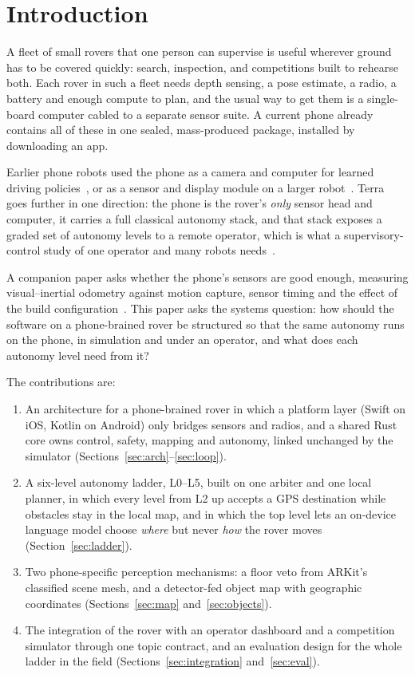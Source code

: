 \documentclass[conference]{IEEEtran}
\begin{document}
\section{Introduction}
\label{sec:intro}

A fleet of small rovers that one person can supervise is useful wherever ground has to be covered quickly: search, inspection, and competitions built to rehearse both.
Each rover in such a fleet needs depth sensing, a pose estimate, a radio, a battery and enough compute to plan, and the usual way to get them is a single-board computer cabled to a separate sensor suite.
A current phone already contains all of these in one sealed, mass-produced package, installed by downloading an app.

Earlier phone robots used the phone as a camera and computer for learned driving policies~\cite{muller2021openbot}, or as a sensor and display module on a larger robot~\cite{oros2013smartphone,fong2013smartspheres}.
Terra goes further in one direction: the phone is the rover's \emph{only} sensor head and computer, it carries a full classical autonomy stack, and that stack exposes a graded set of autonomy levels to a remote operator, which is what a supervisory-control study of one operator and many robots needs~\cite{parasuraman2000levels,beer2014lora,goodrich2001adjustable,cummings2008capacity}.

A companion paper asks whether the phone's sensors are good enough, measuring visual--inertial odometry against motion capture, sensor timing and the effect of the build configuration~\cite{companion2026phone}.
This paper asks the systems question: how should the software on a phone-brained rover be structured so that the same autonomy runs on the phone, in simulation and under an operator, and what does each autonomy level need from it?

The contributions are:
\begin{enumerate}
\item An architecture for a phone-brained rover in which a platform layer (Swift on iOS, Kotlin on Android) only bridges sensors and radios, and a shared Rust core owns control, safety, mapping and autonomy, linked unchanged by the simulator (Sections~\ref{sec:arch}--\ref{sec:loop}).
\item A six-level autonomy ladder, L0--L5, built on one arbiter and one local planner, in which every level from L2 up accepts a GPS destination while obstacles stay in the local map, and in which the top level lets an on-device language model choose \emph{where} but never \emph{how} the rover moves (Section~\ref{sec:ladder}).
\item Two phone-specific perception mechanisms: a floor veto from ARKit's classified scene mesh, and a detector-fed object map with geographic coordinates (Sections~\ref{sec:map} and~\ref{sec:objects}).
\item The integration of the rover with an operator dashboard and a competition simulator through one topic contract, and an evaluation design for the whole ladder in the field (Sections~\ref{sec:integration} and~\ref{sec:eval}).
\end{enumerate}
\end{document}
